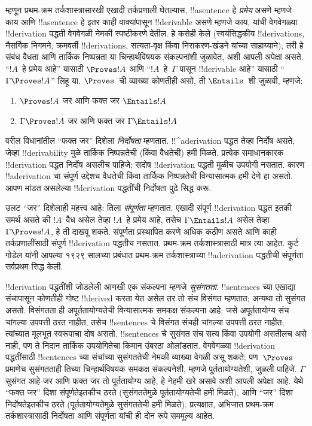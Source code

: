 \documentclass[../../../include/open-logic-section]{subfiles}
\begin{document}
म्हणून प्रथम-क्रम तर्कशास्त्रासारखी एखादी तर्कप्रणाली घेतल्यास,
!!a{sentence} हे \emph{प्रमेय} असणे म्हणजे काय आणि !!a{sentence} हे
इतर काही वाक्यांपासून !!{derivable} असणे म्हणजे काय, यांची
वेगवेगळ्या !!{derivation} पद्धती वेगवेगळी नेमकी स्पष्टीकरणे देतील. हे
कसेही केले (स्वयंसिद्धकीय !!{derivation}s, नैसर्गिक निगमने, क्रमवर्ती
!!{derivation}s, सत्यता-वृक्ष किंवा निराकरण-खंडने यांच्या साहाय्याने),
तरी हे संबंध वैधता आणि तार्किक निष्पन्नता या चिन्हार्थविषयक संकल्पनांशी
जुळावेत, अशी आपली अपेक्षा असते. ``$!A$~हे प्रमेय आहे'' यासाठी
$\Proves !A$ आणि ``$!A$~हे~$\Gamma$ पासून !!{derivable} आहे'' यासाठी
``$\Gamma \Proves !A$'' लिहू या. $\Proves$~ची व्याख्या कोणतीही असो,
ती $\Entails$~शी जुळावी, म्हणजे:
\begin{enumerate}
\item $\Proves !A$ जर आणि फक्त जर $\Entails !A$
\item $\Gamma \Proves !A$ जर आणि फक्त जर $\Gamma \Entails !A$
\end{enumerate}
वरील विधानांतील ``फक्त जर'' दिशेला \emph{निर्दोषता} म्हणतात.
!!^a{derivation} पद्धत तेव्हा निर्दोष असते, जेव्हा !!{derivability} मुळे
तार्किक निष्पन्नतेची (किंवा वैधतेची) हमी मिळते. प्रत्येक समाधानकारक
!!{derivation} पद्धत निर्दोष असलीच पाहिजे; सदोष !!{derivation} पद्धती
मुळीच उपयोगी नसतात. कारण !!a{derivation} चा संपूर्ण उद्देशच वैधतेची
किंवा तार्किक निष्पन्नतेची विन्यासात्मक हमी देणे हा असतो. आपण मांडत
असलेल्या !!{derivation} पद्धतींची निर्दोषता पुढे सिद्ध करू.

उलट ``जर'' दिशेलाही महत्त्व आहे: तिला \emph{संपूर्णता} म्हणतात.
एखादी संपूर्ण !!{derivation} पद्धत इतकी समर्थ असते की $!A$~वैध असेल
तेव्हा $!A$~हे प्रमेय आहे, तसेच $\Gamma \Entails !A$ असेल तेव्हा
$\Gamma \Proves !A$, हे ती दाखवू शकते. संपूर्णता प्रस्थापित करणे अधिक
कठीण असते आणि काही तर्कप्रणालींसाठी संपूर्ण !!{derivation} पद्धतीच
नसतात. प्रथम-क्रम तर्कशास्त्रासाठी मात्र त्या आहेत. कुर्ट गोडेल यांनी
आपल्या १९२९ सालच्या प्रबंधात प्रथम-क्रम तर्कशास्त्राच्या
!!a{derivation} पद्धतीची संपूर्णता सर्वप्रथम सिद्ध केली.

!!{derivation} पद्धतींशी जोडलेली आणखी एक संकल्पना म्हणजे
\emph{सुसंगतता}. !!{sentence}s च्या एखाद्या संचापासून कोणतीही गोष्ट
!!{derive}d करता येत असेल तर तो संच विसंगत म्हणतात; अन्यथा तो सुसंगत
असतो. विसंगतता ही अपूर्ततायोग्यतेची विन्यासात्मक समकक्ष संकल्पना आहे:
जसे अपूर्ततायोग्य संच चांगल्या उपपत्ती ठरत नाहीत, तसेच !!{sentence}s चे
विसंगत संचही चांगल्या उपपत्ती ठरत नाहीत; त्यांच्यात मूलभूत स्वरूपाचा
दोष असतो. !!{sentence}s चे सुसंगत संच सत्य किंवा उपयोगी असतीलच असे
नाही, पण ते निदान तार्किक उपयोगितेचा किमान उंबरठा ओलांडतात. वेगवेगळ्या
!!{derivation} पद्धतींसाठी !!{sentence}s च्या संचांच्या सुसंगततेची नेमकी
व्याख्या वेगळी असू शकते; पण~$\Proves$ प्रमाणेच सुसंगतताही तिच्या
चिन्हार्थविषयक समकक्ष संकल्पनेशी, म्हणजे पूर्ततायोग्यतेशी, जुळली पाहिजे.
$\Gamma$ सुसंगत आहे जर आणि फक्त जर तो पूर्ततायोग्य आहे, हे नेहमी खरे
असावे अशी आपली अपेक्षा आहे. येथे ``फक्त जर'' दिशा संपूर्णतेइतकीच ठरते
(सुसंगततेमुळे पूर्ततायोग्यतेची हमी मिळते), आणि ``जर'' दिशा
निर्दोषतेइतकीच ठरते (पूर्ततायोग्यतेमुळे सुसंगततेची हमी मिळते).
प्रत्यक्षात, अभिजात प्रथम-क्रम तर्कशास्त्रासाठी निर्दोषता आणि संपूर्णता
यांची ही दोन रूपे सममूल्य आहेत.
\end{document}
